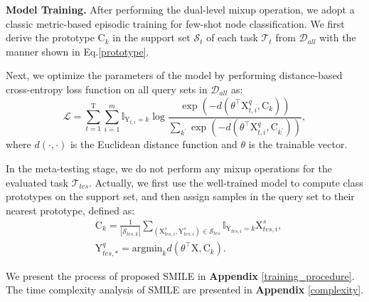 \noindent \textbf{Model Training.}
After performing the dual-level mixup operation, we adopt a classic metric-based episodic training for few-shot node classification. We first derive the prototype $\mathrm{C}_k$ in the support set $\mathcal{S}_t$ of each task $\mathcal{T}_t$ from $\mathcal{D}_{all}$ with the manner shown in Eq.\ref{prototype}.

Next, we optimize the parameters of the model by performing distance-based cross-entropy loss function on all query sets in $\mathcal{D}_{all}$ as:
\begin{equation}
\label{proto}
    \mathcal{L}=%
\sum_{t=1}^\mathrm{T}\sum_{i=1}^{m}\mathbb I_{\mathrm{Y}_{t,i}=k}\log\frac{\exp(-d(\theta^\top\mathrm{X}_{t,i}^q,\mathrm{C}_k))}{\sum\nolimits_{k^\prime}\exp(-d(\theta^\top\mathrm{X}_{t,i}^q,\mathrm{C}_{k^\prime}))},
\end{equation}
where $d(\cdot,\cdot)$ is the Euclidean distance function and $\theta$ is the trainable vector.

In the meta-testing stage, we do not perform any mixup operations for the evaluated task $\mathcal{T}_{tes}$. Actually, we first use the well-trained model to compute class prototypes on the support set, and then assign samples in the query set to their nearest prototype, defined as: %
\begin{equation}
    \label{meta-test}
    \begin{aligned}
        &\mathrm{C}_{k}\!=\!\frac{1}{|\mathcal{S}_{tes,k}|}\sum_{(\mathrm{X}_{tes,i}^s,\mathrm{Y}_{tes,i}^s)\in\mathcal{S}_{tes}}\mathbb{I}_{\mathrm{Y}_{tes,i}=k}\mathrm{X}_{tes,i}^s, \\        &\mathrm{Y}_{tes,\ast}^q\!=\!\text{argmin}_kd(\theta^\top\mathrm{X}, \mathrm{C}_k).
    \end{aligned}
\end{equation}

We present the process of proposed SMILE in \textbf{Appendix} \ref{training_procedure}. The time complexity analysis of SMILE are presented in \textbf{Appendix} \ref{complexity}.